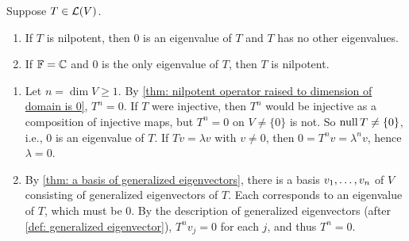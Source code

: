 \begin{thm}
  \label{thm: eigenvalues of nilpotent operator}
  Suppose $T \in \mathcal{L}(V)$.
  \begin{enumerate}[label=\textbf{(\alph*)}]
    \item If $T$ is nilpotent, then $0$ is an eigenvalue of $T$ and $T$ has no other eigenvalues.
    \item If $\mathbb{F} = \mathbb{C}$ and $0$ is the only eigenvalue of $T$, then $T$ is nilpotent.
  \end{enumerate}
\end{thm}
\begin{prf}
  \begin{enumerate}[label=\textbf{(\alph*)}]
    \item Let $n = \dim V \geq 1$. By \ref{thm: nilpotent operator raised to dimension of domain is 0}, $T^n = 0$. If $T$ were injective, then $T^n$ would be injective as a composition of injective maps, but $T^n = 0$ on $V \neq \{0\}$ is not. So $\operatorname{null} T \neq \{0\}$, i.e., $0$ is an eigenvalue of $T$.
    If $Tv = \lambda v$ with $v \neq 0$, then $0 = T^n v = \lambda^n v$, hence $\lambda = 0$.
    \item By \ref{thm: a basis of generalized eigenvectors}, there is a basis $v_1, \dots, v_n$ of $V$ consisting of generalized eigenvectors of $T$. Each corresponds to an eigenvalue of $T$, which must be $0$. By the description of generalized eigenvectors (after \ref{def: generalized eigenvector}), $T^n v_j = 0$ for each $j$, and thus $T^n = 0$.
  \end{enumerate}
  \vspace{-\baselineskip}
\end{prf}

